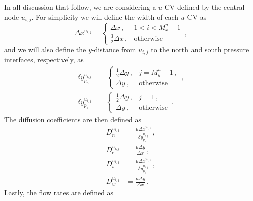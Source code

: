 \documentclass{article}
\begin{document}
In all discussion that follow, we are considering a $u$-CV defined by the central node $u_{i,j}$. For simplicity we will define the width of each $u$-CV as
\begin{equation}
\Delta x^{u_{i,j}} = \begin{cases}
\Delta x\,, & 1 < i < M_x^u - 1 \\
\frac{3}{2} \Delta x\,, & \text{otherwise}
\end{cases}\,,
\end{equation}
and we will also define the $y$-distance from $u_{i,j}$ to the north and south pressure interfaces, respectively, as
\begin{subequations}
	\begin{align}
	\delta y^{u_{i,j}}_{p_n} & = \begin{cases}
	\frac{1}{2} \Delta y\,, & j = M_y^u - 1\,, \\
	\Delta y\,, & \text{otherwise}
	\end{cases}\,, \\
	\delta y^{u_{i,j}}_{p_s} & = \begin{cases}
	\frac{1}{2} \Delta y\,, & j = 1\,, \\
	\Delta y\,, & \text{otherwise}
	\end{cases}\,.
	\end{align}
\end{subequations}
The diffusion coefficients are then defined as
\begin{subequations}
	\begin{align}
	D_n^{u_{i,j}} & = \frac{\mu \Delta x^{u_{i,j}}}{\delta y^{u_{i,j}}_{p_n}}\,,\\
	D_e^{u_{i,j}} & = \frac{\mu\Delta y}{\Delta x}\,,\\
	D_s^{u_{i,j}} & = \frac{\mu \Delta x^{u_{i,j}}}{\delta y^{u_{i,j}}_{p_s}}\,,\\
	D_w^{u_{i,j}} & = \frac{\mu\Delta y}{\Delta x}\,.
	\end{align}
\end{subequations}
Lastly, the flow rates are defined as
\end{document}
